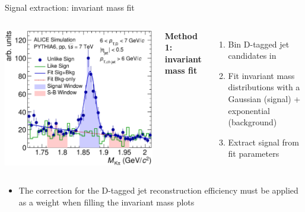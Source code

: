 \documentclass[xcolor={usenames,dvipsnames}]{beamer}
\begin{document}
\begin{frame}{Signal extraction: invariant mass fit}
\begin{columns}

\includegraphics[width=\textwidth]{img/HQ16_Simulation_InvMassSB}

\textbf{\alert{Method 1: invariant mass fit}}
\begin{enumerate}
\item Bin D-tagged jet candidates in \alert{\ptchjet}
\item \alert{Fit invariant mass distributions} with a Gaussian (signal) + exponential (background)
\item Extract signal from fit parameters
\end{enumerate}
\end{columns}
\begin{itemize}
\item The correction for the D-tagged jet reconstruction efficiency must be applied as a weight when filling the invariant mass plots
\end{itemize}
\end{frame}
\end{document}
